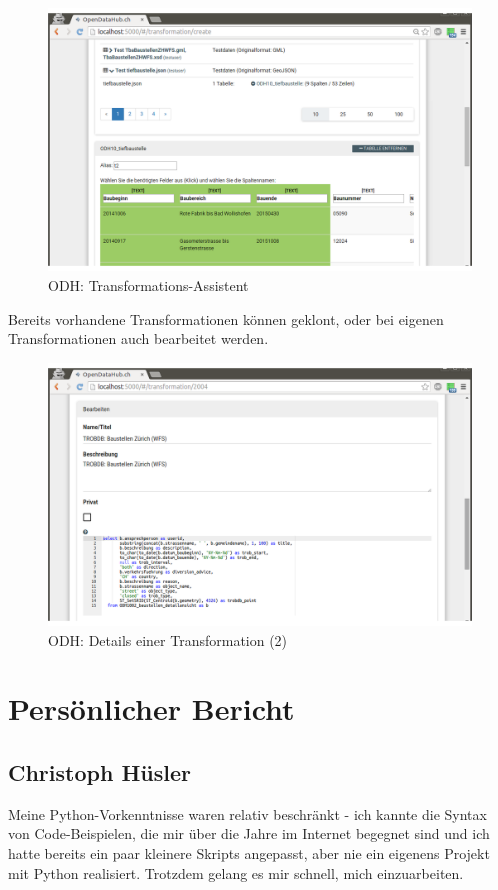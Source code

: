 \begin{figure}[H]
    \centering
    \includegraphics[width=2\linewidth/3]{fig/odh-transformation-assistant}
    \caption{ODH: Transformations-Assistent}
\end{figure}

Bereits vorhandene Transformationen können geklont, oder bei eigenen Transformationen auch bearbeitet werden.

\begin{figure}[H]
    \centering
    \includegraphics[width=2\linewidth/3]{fig/odh-edit-transformation}
    \caption{ODH: Details einer Transformation (2)}
\end{figure}

\section{Persönlicher Bericht}

\subsection{Christoph Hüsler}
Meine Python-Vorkenntnisse waren relativ beschränkt - ich kannte die Syntax von Code-Beispielen, die mir über die Jahre im Internet begegnet sind und ich hatte bereits ein paar kleinere Skripts angepasst, aber nie ein eigenens Projekt mit Python realisiert. Trotzdem gelang es mir schnell, mich einzuarbeiten.

